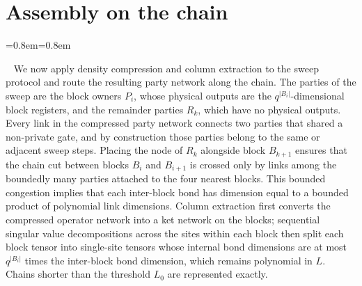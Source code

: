 \documentclass[aps,prx,reprint,superscriptaddress,floatfix,nofootinbib,longbibliography,amsmath,amssymb]{revtex4-2}
\newcommand{\abs}[1]{\lvert #1\rvert}
\theoremstyle{plain}
\theoremstyle{definition}
\newenvironment{inwords}{%
  \par\medskip\noindent
  \begin{list}{}{\leftmargin=0.8em\rightmargin=0.8em}
  \item\relax
  \noindent{\sffamily\bfseries\color{blue!40!black}In words.}\ \sffamily\small}{%
  \end{list}\par\medskip}
\begin{document}
\section{Assembly on the chain}\label{sec:routing}

\begin{inwords}
We now apply density compression and column extraction to the sweep protocol
and route the resulting party network along the chain. The parties of the
sweep are the block owners $P_i$, whose physical outputs are the
$q^{\abs{B_i}}$-dimensional block registers, and the remainder parties $R_k$,
which have no physical outputs. Every link in the compressed party network
connects two parties that shared a non-private gate, and by construction
those parties belong to the same or adjacent sweep steps. Placing the node of
$R_k$ alongside block $B_{k+1}$ ensures that the chain cut between blocks
$B_i$ and $B_{i+1}$ is crossed only by links among the boundedly many parties
attached to the four nearest blocks. This bounded congestion implies that each
inter-block bond has dimension equal to a bounded product of polynomial link
dimensions. Column extraction first converts the compressed operator network
into a ket network on the blocks; sequential singular value decompositions
across the sites within each block then split each block tensor into
single-site tensors whose internal bond dimensions are at most
$q^{\abs{B_i}}$ times the inter-block bond dimension, which remains
polynomial in $L$. Chains shorter than the threshold $L_0$ are represented
exactly.
\end{inwords}
\end{document}
